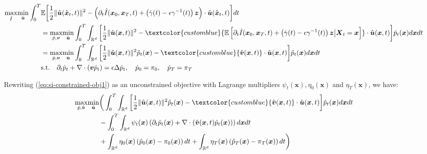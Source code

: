 \documentclass{article}
\newcommand{\bluetext}[1]{\textcolor{customblue}{#1}}
\begin{document}
\begin{small}
\begin{align}
    \underset{\hat{I}}{\max}\underset{\hat{\boldsymbol{u}}}{\min}\int_0^T&\mathbb{E}\bigg[\frac{1}{2}\|\hat{\boldsymbol{u}}(\hat{\boldsymbol{x}}_t,t)\|^2-\left(\partial_t\hat{I}(\boldsymbol{x}_0, \boldsymbol{x}_T,t)+\left(\dot{\gamma}(t)-\epsilon\gamma^{-1}(t)\right)\boldsymbol{z}\right)\cdot \hat{\boldsymbol{u}}(\hat{\boldsymbol{x}}_t,t)\bigg]dt\nonumber\\
    &=\underset{\hat{p}, \boldsymbol{v}}{\max}\underset{\hat{\boldsymbol{u}}}{\min}\int_0^T\int_{\mathbb{R}^d}\bigg[\frac{1}{2}\|\hat{\boldsymbol{u}}(\boldsymbol{x},t)\|^2-\bluetext{\mathbb{E}\left[\partial_t\hat{I}(\boldsymbol{x}_0, \boldsymbol{x}_T,t)+\left(\dot{\gamma}(t)-\epsilon\gamma^{-1}(t)\right)\boldsymbol{z}\big|\boldsymbol{X}_t=\boldsymbol{x}\right]}\cdot \hat{\boldsymbol{u}}(\boldsymbol{x},t)\bigg]\hat{p}_t(\boldsymbol{x})d\boldsymbol{x}dt\nonumber\\
    &=\underset{\hat{p}, \boldsymbol{v}}{\max}\underset{\hat{\boldsymbol{u}}}{\min}\int_0^T\int_{\mathbb{R}^d}\bigg[\frac{1}{2}\|\hat{\boldsymbol{u}}(\boldsymbol{x},t)\|^2\hat{p}_t(\boldsymbol{x})-\bluetext{\hat{\boldsymbol{v}}(\boldsymbol{x},t)}\cdot \hat{\boldsymbol{u}}(\boldsymbol{x},t)\bigg]\hat{p}_t(\boldsymbol{x})d\boldsymbol{x}dt\label{eq:si-constrained-obj1}\\
    &\text{s.t.}\quad \partial_t\hat{p}_t+\nabla\cdot (\boldsymbol{v}\hat{p}_t)=\epsilon \Delta\hat{p}_t, \quad \hat{p}_0=\pi_0, \quad \hat{p}_ T=\pi_T\nonumber
\end{align}
\end{small}
Rewriting (\ref{eq:si-constrained-obj1}) as an unconstrained objective with Lagrange multipliers $\psi_t(\boldsymbol{x}), \eta_0(\boldsymbol{x})$ and $\eta_T(\boldsymbol{x})$, we have:
\begin{align}
    \underset{\hat{p}, \hat{\boldsymbol{v}}}{\max}\underset{\hat{\boldsymbol{u}}}{\min}&\bigg(\int_0^T\int_{\mathbb{R}^d}\bigg[\frac{1}{2}\|\hat{\boldsymbol{u}}(\boldsymbol{x},t)\|^2\hat{p}_t(\boldsymbol{x})-\bluetext{\hat{\boldsymbol{v}}(\boldsymbol{x},t)}\cdot \hat{\boldsymbol{u}}(\boldsymbol{x},t)\bigg]\hat{p}_t(\boldsymbol{x})d\boldsymbol{x}dt\nonumber\\
    &-\int_0^T\int_{\mathbb{R}^d}\psi_t(\boldsymbol{x})\left(\partial_t\hat{p}_t(\boldsymbol{x})+\nabla\cdot (\hat{\boldsymbol{v}}(\boldsymbol{x},t)\hat{p}_t(\boldsymbol{x}))\right)d\boldsymbol{x}dt\nonumber\\
    &+\int_{\mathbb{R}^d}\eta_0(\boldsymbol{x})\left(\hat{p}_0(\boldsymbol{x})-\pi_0(\boldsymbol{x})\right)dt+\int_{\mathbb{R}^d}\eta_T(\boldsymbol{x})\left(\hat{p}_T(\boldsymbol{x})-\pi_T(\boldsymbol{x})\right)dt\bigg)
\end{align}
\end{document}
